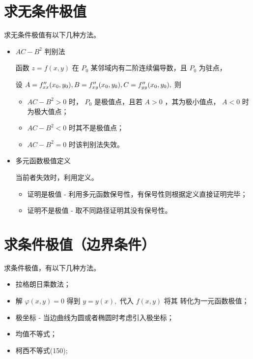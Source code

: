 \section{求无条件极值}

求无条件极值有以下几种方法。

\begin{itemize}
    \item $ AC - B^2 $ 判别法
    
    函数 $ z = f(x,y) $ 在 $ P_0 $ 某邻域内有二阶连续偏导数，且 $ P_0 $ 为驻点，

    设 $ A = f^{\prime\prime}_{xx}(x_0,y_0),B = f^{\prime\prime}_{xy}(x_0,y_0),C = f^{\prime\prime}_{yy}(x_0,y_0), $ 则
    \begin{itemize}
        \item $ AC - B^2 > 0 $ 时， $ P_0 $ 是极值点，且若 $ A>0 $ ，其为极小值点，
        $ A<0 $ 时为极大值点；
        \item $ AC-B^2<0 $ 时其不是极值点；
        \item $ AC-B^2 = 0 $ 时该判别法失效。
    \end{itemize}
    \item 多元函数极值定义
    
    当前者失效时，利用定义。
    \begin{itemize}
        \item 证明是极值 - 利用多元函数保号性，有保号性则根据定义直接证明完毕；
        \item 证明不是极值 - 取不同路径证明其没有保号性。
    \end{itemize}
\end{itemize}

\section{求条件极值（边界条件）}

求条件极值，有以下几种方法。

\begin{itemize}
    \item 拉格朗日乘数法；
    \item 解 $ \varphi(x,y) = 0 $ 得到 $ y = y(x), $ 代入 $ f(x,y) $ 将其
    转化为一元函数极值；
    \item 极坐标 - 当边曲线为圆或者椭圆时考虑引入极坐标；
    \item 均值不等式；
    \item 柯西不等式(150);
\end{itemize}


